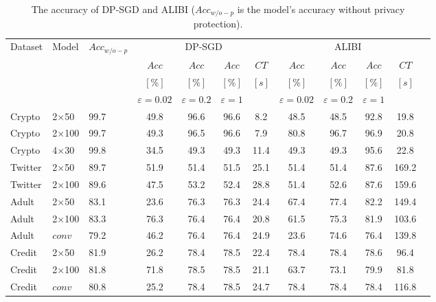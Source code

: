 \begin{table}[t]
\small
\begin{center}
\caption{The accuracy of DP-SGD and ALIBI ($Acc_{w/o-p}$ is the model's accuracy without privacy protection).}
\begin{tabular}{lll ccccc cccc}
\toprule
Dataset & Model & $Acc_{w/o-p}$   & \multicolumn{4}{c}{DP-SGD} & \multicolumn{4}{c}{ ALIBI}\\
 \cmidrule(lr){4-7} \cmidrule(lr){8-11}  
        &       &         &  $Acc$              &  $Acc$              & $Acc$           & $CT$   &  $Acc$           & $Acc$            & $Acc$         & $CT$ \\  
        &       &         &  $[\%]$            & $[\%]$              & $[\%]$          & $[s]$ &  $[\%]$          &  $[\%]$          & $[\%]$          & $[s]$ \\  
        &       &         & $\varepsilon=0.02$ &  $\varepsilon=0.2$  & $\varepsilon=1$   & &  $\varepsilon=0.02$ &  $\varepsilon=0.2$  & $\varepsilon=1$  & \\  

\midrule
Crypto   & 2$\times$50    &  99.7   &     49.8  &  96.6  &  96.6  &  8.2  &   48.5 &   48.5  &   92.8    & 19.8       \\ 
Crypto   & 2$\times$100   &  99.7   &    49.3  &  96.5  &  96.6  &  7.9  &   80.8 &   96.7  &   96.9    & 20.8       \\   
Crypto   & 4$\times$30    &  99.8   &      34.5  &  49.3  &  49.3  &  11.4  &   49.3 &   49.3  &   95.6    & 22.8       \\     
\midrule
Twitter   & 2$\times$50   &  89.7   &      51.9  &  51.4  &  51.5  &  25.1  &   51.4 &   51.4  &   87.6    & 169.2       \\  
Twitter   & 2$\times$100  &  89.6   &      47.5  &  53.2  &  52.4  &  28.8  &   51.4 &   52.6  &   87.6    & 159.6       \\ 
\midrule
Adult   & 2$\times$50     &  83.1   &        23.6  &  76.3  &  76.3  &  24.4  &   67.4 &   77.4  &   82.2    & 149.4       \\     

Adult   & 2$\times$100    &  83.3   &        76.3  &  76.4  &  76.4  &  20.8   &   61.5 &   75.3  &   81.9    & 103.6       \\ 

Adult   & $conv$          &  79.2   &        46.2  &  76.4  &  76.4  &  24.9   &   23.6 &   74.6  &   76.4    & 139.8       \\ 
\midrule
Credit   & 2$\times$50    &  81.9   &        26.2  &  78.4  &  78.5  &  22.4  &   78.4 &   78.4  &   78.6    & 96.4       \\ 
Credit   & 2$\times$100   &  81.8   &        71.8  &  78.5  &  78.5  &  21.1  &   63.7 &   73.1  &   79.9    & 81.8       \\ 
Credit   & $conv$         &  80.8   &        25.2  &  78.4  &  78.5  &  24.7  &   78.4 &   78.4  &   78.4    & 116.8       \\     
\bottomrule        
\end{tabular}
    \label{tab:results2}
\quad
\end{center}
\end{table} 


